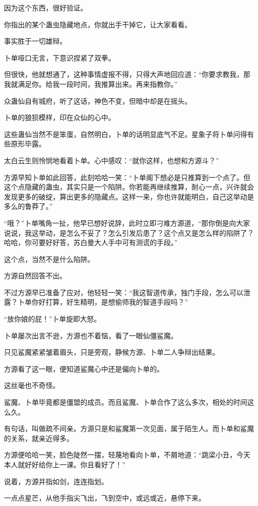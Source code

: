 \begin{this_body}
因为这个东西，很好验证。

你指出的某个蛊虫隐藏地点，你就出手干掉它，让大家看看。

事实胜于一切雄辩。

卜单哑口无言，下意识捏紧了双拳。

但很快，他就想通了，这种事情虚报不得，只得大声地回应道：“你要求教我，那我就满足你。给我一段时间，我推算出来。再来指教你。”

众蛊仙自有城府，听了这话，神色不变，但暗中却是在摇头。

卜单的狼狈模样，印在众仙的心中。

这些蛊仙当然不是笨蛋，自然明白，卜单的话明显底气不足。星象子将卜单问得有些原形毕露。

太白云生则怜悯地看着卜单。心中感叹：“就你这样，也想和方源斗？”

方源早知卜单如此回答，此刻哈哈一笑：“卜单阁下想必是只推算到一个点了。但这个点隐藏的蛊虫，其实只是一个陷阱。你若能再继续推算，耐心一点，兴许就会发现更多的破绽，算出更多的隐藏点。这样一来，你也许就能明白，自己这举动是多么的鲁莽了。”

“哦？”卜单嘴角一扯，他早已想好说辞，此时立即刁难方源道，“那你倒是向大家说说，我这举动，是怎么不妥了？怎么引发后患了？这个点又是怎么样的陷阱了？哈哈，你可要好好答，苏白曼大人手中可有测谎的手段。”

这个点，当然不是什么陷阱。

方源自然回答不出。

不过方源早已准备了应对，他轻轻一笑：“我这智道传承，独门手段，怎么可以泄露？卜单你好打算，好生精明，是想偷师我的智道手段吗？”

“放你娘的屁！”卜单旋即大怒。

卜单屡次出言不逊，方源也不着恼，看了一眼仙僵鲨魔。

只见鲨魔紧紧皱着眉头，只是旁观，静候方源、卜单二人争辩出结果。

方源看了这一眼，便知道鲨魔心中还是偏向卜单的。

这丝毫也不奇怪。

鲨魔、卜单毕竟都是僵盟的成员。而且鲨魔、卜单合作了这么多次，相处的时间这么久。

有句话，叫做疏不间亲。方源只是和鲨魔第一次见面，属于陌生人。而卜单和鲨魔的关系，就亲近得多。

方源便哈哈一笑，脸色陡然一摆，轻蔑地看向卜单，不屑地道：“跳梁小丑，今天本人就好好给你上一课。你且看好了！”

说着，方源并指如剑，连连指划。

一点点星芒，从他手指尖飞出，飞到空中，或远或近，悬停下来。


\end{this_body}
